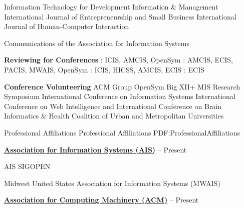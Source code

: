 \documentclass[letterpaper,MMMyyyy,nonstopmode]{simpleresumecv}
\begin{document}
\begin{Body}
\hfill
{}
\begin{Detail}
\SubBulletItem
Information Technology for Development
\SubBulletItem
Information \& Management
\SubBulletItem
International Journal of Entrepreneurship and Small Business
\SubBulletItem
International Journal of Human-Computer Interaction 
\end{Detail}

\hfill
{}
\begin{Detail}
\SubBulletItem
Communications of the Association for Information Systems 
\end{Detail}


\BigGap
\Entry
\textbf{Reviewing for Conferences}
: ICIS, AMCIS, OpenSym
\hfill
{}
: AMCIS, ECIS, PACIS, MWAIS, OpenSym
\hfill
{}
: ICIS, HICSS, AMCIS, ECIS
\hfill
{}
: ECIS
\hfill
{}


\BigGap
\Entry
\textbf{Conference Volunteering}
\BulletItem
ACM Group
\hfill
{}
\BulletItem
OpenSym
\hfill
{}
\BulletItem
Big XII+ MIS Research Symposium
\hfill
{}
\BulletItem
International Conference on Information Systems
\hfill
{}
\BulletItem
International Conference on Web Intelligence\newline
and International Conference on Brain Informatics \& Health
\hfill
{}
\BulletItem
Coalition of Urban and Metropolitan Universities
\hfill
{}


\Section
{Professional Affiliations}%
{Professional Affiliations}%
{PDF:ProfessionalAffiliations}

\Entry
\href{http://aisnet.org/default.asp?}
{\textbf{Association for Information Systems (AIS)}}
\hfill
{} --
Present

\BulletItem
AIS SIGOPEN

\BulletItem
Midwest United States Association for Information Systems (MWAIS)

\BigGap
\Entry
\href{https://www.acm.org/}
{\textbf{Association for Computing Machinery (ACM)}}
\hfill
{} --
Present






\end{Body}
\end{document}
